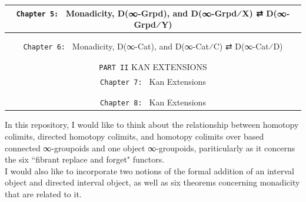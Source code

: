 \documentclass{book}
\theoremstyle{definition}
\begin{document}
{\begin{longtable}{|| l || l ||}
\hline \hline
\multicolumn{2}{||c||}{\texttt{Chapter 5: } Monadicity, D(∞-Grpd), and D(∞-Grpd⁄X) ⇄ D(∞-Grpd⁄Y)} \\
\hline \hline
 & \\
\hline
 & \\
\hline \hline
\multicolumn{2}{||c||}{\texttt{Chapter 6: } Monadicity, D(∞-Cat), and D(∞-Cat⁄C) ⇄ D(∞-Cat⁄D)} \\
\hline \hline
 & \\
\hline
 & \\
\hline \hline
\multicolumn{2}{||c||}{\texttt{PART II} KAN EXTENSIONS} \\
\hline \hline
\multicolumn{2}{||c||}{\texttt{Chapter 7: } Kan Extensions} \\
\hline \hline
 & \\
\hline
 & \\
\hline \hline
\multicolumn{2}{||c||}{\texttt{Chapter 8: } Kan Extensions} \\
\hline \hline
\end{longtable}
}

In this repository, I would like to think about the relationship between homotopy colimits, directed homotopy colimits, and homotopy colimits over based connected ∞-groupoids and one object ∞-groupoids, pariticularly as it concerns the six ``fibrant replace and forget" functors.\\

I would also like to incorporate two notions of the formal addition of an interval object and directed interval object, as well as six theorems concerning monadicity that are related to it.\\

\end{document}
